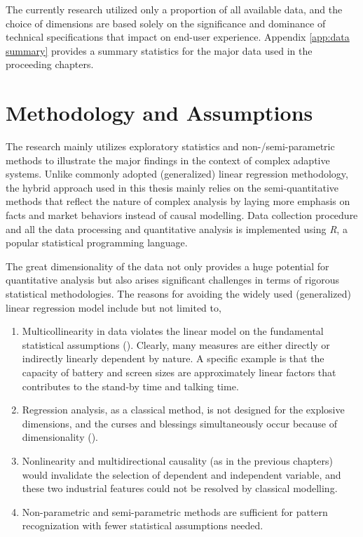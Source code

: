 \documentclass[utf8,english]{gradu3}
\begin{document}
The currently research utilized only a proportion of all available data, and the choice of dimensions are based solely on the significance and dominance of technical specifications that impact on end-user experience. Appendix \ref{app:data summary} provides a summary statistics for the major data used in the proceeding chapters.

\section{Methodology and Assumptions}

The research mainly utilizes exploratory statistics and non-/semi-parametric methods to illustrate the major findings in the context of complex adaptive systems. Unlike commonly adopted (generalized) linear regression methodology, the hybrid approach used in this thesis mainly relies on the semi-quantitative methods that reflect the nature of complex analysis by laying more emphasis on facts and market behaviors instead of causal modelling. Data collection procedure and all the data processing and quantitative analysis is implemented using \textit{R}, a popular statistical programming language. 

The great dimensionality of the data not only provides a huge potential for quantitative analysis but also arises significant challenges in terms of rigorous statistical methodologies. The reasons for avoiding the widely used (generalized) linear regression model include but not limited to,

\begin{enumerate}
    \item Multicollinearity in data violates the linear model on the fundamental statistical assumptions (\cite{farrar1967multicollinearity}). Clearly, many measures are either directly or indirectly linearly dependent by nature. A specific example is that the capacity of battery and screen sizes are approximately linear factors that contributes to the stand-by time and talking time. 
    \item Regression analysis, as a classical method, is not designed for the explosive dimensions, and the curses and blessings simultaneously occur because of dimensionality (\cite{donoho2000high}).
    \item Nonlinearity and multidirectional causality (as in the previous chapters) would invalidate the selection of dependent and independent variable, and these two industrial features could not be resolved by classical modelling.
    \item Non-parametric and semi-parametric methods are sufficient for pattern recognization with fewer statistical assumptions needed.
\end{enumerate}
\end{document}
